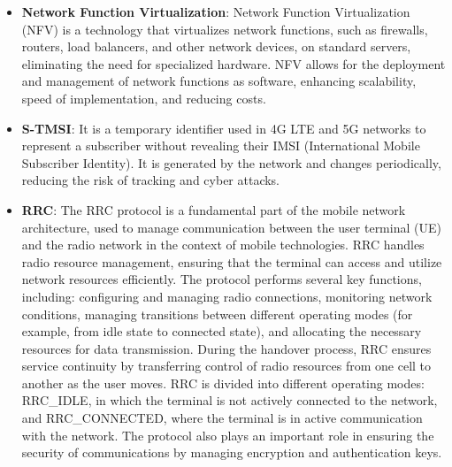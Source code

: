 \documentclass[english]{article}
\begin{document}
\begin{itemize}
	\item \textbf{\hypertarget{NFV}{Network Function Virtualization}}:
	      Network Function Virtualization (NFV) is a technology that virtualizes network functions,
	      such as firewalls, routers, load balancers, and other network devices, on standard servers,
	      eliminating the need for specialized hardware. NFV allows for the deployment and management
	      of network functions as software, enhancing scalability, speed of implementation, and reducing costs.

	\item \textbf{\hypertarget{S-TMSI}{S-TMSI}}:
	      It is a temporary identifier used in 4G LTE and 5G networks to represent a
	      subscriber without revealing their IMSI (International Mobile Subscriber Identity).
	      It is generated by the network and changes periodically, reducing the risk of
	      tracking and cyber attacks.

	\item \textbf{\hypertarget{RRC}{RRC}}:
	      The RRC protocol is a fundamental part of the mobile network architecture,
	      used to manage communication between the user terminal (UE) and the radio
	      network in the context of mobile technologies. RRC handles radio resource management,
	      ensuring that the terminal can access and utilize network resources efficiently.
	      The protocol performs several key functions, including: configuring and managing
	      radio connections, monitoring network conditions, managing transitions between different
	      operating modes (for example, from idle state to connected state), and allocating
	      the necessary resources for data transmission. During the handover process,
	      RRC ensures service continuity by transferring control of radio resources from
	      one cell to another as the user moves. RRC is divided into different operating modes:
	      RRC\_IDLE, in which the terminal is not actively connected to the network, and
	      RRC\_CONNECTED, where the terminal is in active communication with the network.
	      The protocol also plays an important role in ensuring the security of communications
	      by managing encryption and authentication keys.


\end{itemize}
\end{document}

